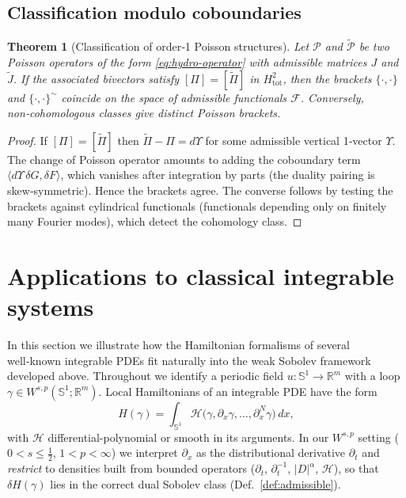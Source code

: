 \documentclass{amsart}
\newcounter{thm}
\newcounter{re}
\newtheorem{theorem}[thm]{Theorem}
\begin{document}
\subsection{Classification modulo coboundaries}
\begin{theorem}[Classification of order‑1 Poisson structures]\label{th:classification}
Let \(\mathcal P\) and \(\widetilde{\mathcal P}\) be two Poisson operators of the
form \eqref{eq:hydro-operator} with admissible matrices \(J\) and
\(\widetilde J\).  If the associated bivectors satisfy
\([\Pi]=[\widetilde\Pi]\) in \(H^{2}_{\mathrm{tot}}\), then the brackets
\(\{\cdot,\cdot\}\) and \(\{\cdot,\cdot\}^{\!\sim}\) coincide on the space of
admissible functionals \(\mathcal F\).  Conversely, non‑cohomologous classes give
distinct Poisson brackets.
\end{theorem}
\begin{proof}
If \([\Pi]=[\widetilde\Pi]\) then \(\widetilde\Pi-\Pi=d\Upsilon\) for some admissible
vertical 1‑vector \(\Upsilon\).  The change of Poisson operator amounts to adding the
coboundary term \(\langle d\Upsilon\,\delta G,\delta F\rangle\), which vanishes after
integration by parts (the duality pairing is skew‑symmetric).  Hence the brackets
agree.  The converse follows by testing the brackets against cylindrical
functionals (functionals depending only on finitely many Fourier modes), which
detect the cohomology class.
\end{proof}




\section{Applications to classical integrable systems}
\label{sec:applications}

In this section we illustrate how the Hamiltonian formalisms of several
well‑known integrable PDEs fit naturally into the weak Sobolev framework
developed above.  Throughout we identify a periodic field \(u:\mathbb S^{1}\to\mathbb R^{m}\)
with a loop \(\gamma\in W^{s,p}(\mathbb S^{1};\mathbb R^{m})\).
Local Hamiltonians of an integrable PDE have the form
\[
H(\gamma)=\int_{\mathbb S^1}\! \mathcal H\big(\gamma,\partial_x\gamma,\dots,\partial_x^N\gamma\big)\,dx,
\]
with $\mathcal H$ differential-polynomial or smooth in its arguments.
In our $W^{s,p}$ setting ($0<s\le\tfrac12$, $1<p<\infty$) we interpret $\partial_x$
as the distributional derivative $\partial_t$ and \emph{restrict} to densities
built from bounded operators ($\partial_t$, $\partial_t^{-1}$, $|D|^\alpha$, $\mathcal H$),
so that $\delta H(\gamma)$ lies in the correct dual Sobolev class (Def.~\ref{def:admissible}).
\end{document}
